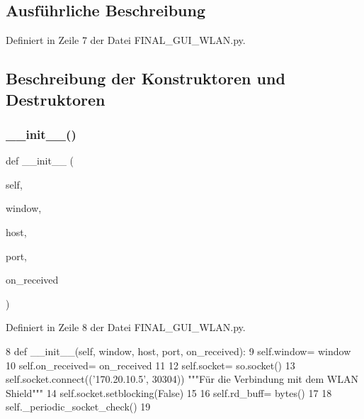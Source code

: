 \subsection{Ausführliche Beschreibung}


Definiert in Zeile 7 der Datei F\+I\+N\+A\+L\+\_\+\+G\+U\+I\+\_\+\+W\+L\+A\+N.\+py.



\subsection{Beschreibung der Konstruktoren und Destruktoren}
\mbox{\label{class_f_i_n_a_l___g_u_i___w_l_a_n_1_1_arduino_a86404a4415caa006d76a1b7afa696fee}} 
\subsubsection{\texorpdfstring{\+\_\+\+\_\+init\+\_\+\+\_\+()}{\_\_init\_\_()}}
{\footnotesize\ttfamily def \+\_\+\+\_\+init\+\_\+\+\_\+ (\begin{DoxyParamCaption}\item[{}]{self,  }\item[{}]{window,  }\item[{}]{host,  }\item[{}]{port,  }\item[{}]{on\+\_\+received }\end{DoxyParamCaption})}



Definiert in Zeile 8 der Datei F\+I\+N\+A\+L\+\_\+\+G\+U\+I\+\_\+\+W\+L\+A\+N.\+py.


\begin{DoxyCode}
8     \textcolor{keyword}{def }\_\_init\_\_(self, window, host, port, on\_received):
9         self.window= window
10         self.on\_received= on\_received
11 
12         self.socket= so.socket()
13         self.socket.connect((\textcolor{stringliteral}{'170.20.10.5'}, 30304))    \textcolor{stringliteral}{"""Für die Verbindung mit dem WLAN Shield"""}
14         self.socket.setblocking(\textcolor{keyword}{False})
15 
16         self.rd\_buff= bytes()
17 
18         self.\_periodic\_socket\_check()
19 
\end{DoxyCode}


